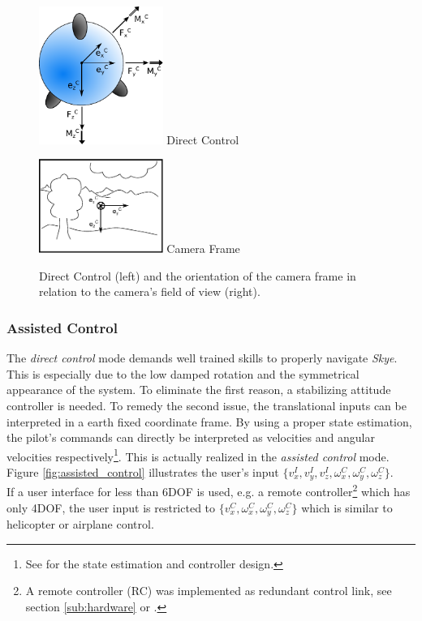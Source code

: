 \begin{figure}[H]		
	\small{
		\begin{center}
			\parbox{0.36\textwidth}{\centering \includegraphics[width=0.36\textwidth]{DC}
			 Direct Control}
			\hspace{0.1\textwidth}			
			\parbox{0.36\textwidth}{\centering \includegraphics[width=0.36\textwidth]{CameraFrame}
			Camera Frame}
	\caption[Assisted Control]{Direct Control (left) and the orientation of the camera frame in relation to the camera's field of view (right).}
		\label{fig:direct_control}
		\end{center}
	}			
	\vspace{4.5mm}
\end{figure}


\subsubsection{Assisted Control} 
The \textit{direct control} mode demands well trained skills to properly navigate \textit{Skye}. This is especially due to the low damped rotation \cite{weichart} and the symmetrical appearance of the system. To eliminate the first reason, a stabilizing attitude controller is needed. To remedy the second issue, the translational inputs can be interpreted in a earth fixed coordinate frame. By using a proper state estimation, the pilot's commands can directly be interpreted as velocities and angular velocities respectively\footnote{See \cite{meiermueri} for the state estimation and controller design.}. This is actually realized in the \textit{assisted control} mode. Figure \ref{fig:assisted_control} illustrates the user's input $\{v_x^I, v_y^I, v_z^I, \omega_x^C, \omega_y^C, \omega_z^C\}$. \\
If a user interface for less than 6DOF is used, e.g. a remote controller\footnote{A remote controller (RC) was implemented as redundant control link, see section \ref{sub:hardware} or \cite{burri}.} which has only 4DOF, the user input is restricted to $\{v_x^C, \omega_x^C, \omega_y^C, \omega_z^C\}$ which is similar to helicopter or airplane control.


